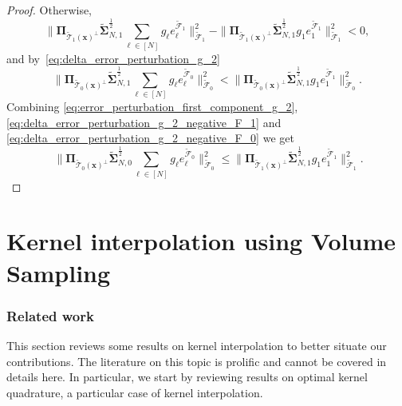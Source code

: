 \documentclass[twoside,11pt]{book}
\newcommand{\rb}[1]{\textcolor{magenta}{#1}}
\begin{document}
\begin{proof}
Otherwise,  
\begin{equation}\label{eq:delta_error_perturbation_g_2_negative_F_1}
 \|\bm{\Pi}_{\tilde{\mathcal{T}}_{1}(\bm{x})^{\perp}} \tilde{\bm{\Sigma}}_{N,1}^{\frac{1}{2}} \sum\limits_{\ell \in [N]}g_{\ell} e_{\ell}^{\tilde{\mathcal{F}}_{1}}\|_{\tilde{\mathcal{F}}_{1}}^{2} - \|\bm{\Pi}_{\tilde{\mathcal{T}}_{1}(\bm{x})^{\perp}} \tilde{\bm{\Sigma}}_{N,1}^{\frac{1}{2}} g_{1} e_{1}^{\tilde{\mathcal{F}}_{1}}\|_{\tilde{\mathcal{F}}_{1}}^{2} < 0, 
\end{equation}
and by~\eqref{eq:delta_error_perturbation_g_2}
\begin{equation}\label{eq:delta_error_perturbation_g_2_negative_F_0}
\|\bm{\Pi}_{\tilde{\mathcal{T}}_{0}(\bm{x})^{\perp}} \tilde{\bm{\Sigma}}_{N,1}^{\frac{1}{2}} \sum\limits_{\ell \in [N]}g_{\ell} e_{\ell}^{\tilde{\mathcal{F}}_{0}}\|_{\tilde{\mathcal{F}}_{0}}^{2} < \|\bm{\Pi}_{\tilde{\mathcal{T}}_{0}(\bm{x})^{\perp}} \tilde{\bm{\Sigma}}_{N,1}^{\frac{1}{2}} g_{1} e_{1}^{\tilde{\mathcal{F}}_{1}}\|_{\tilde{\mathcal{F}}_{0}}^{2}.
\end{equation}
Combining \eqref{eq:error_perturbation_first_component_g_2}, \eqref{eq:delta_error_perturbation_g_2_negative_F_1} and \eqref{eq:delta_error_perturbation_g_2_negative_F_0} 
we get
\begin{equation}
\:\|\bm{\Pi}_{\tilde{\mathcal{T}}_{0}(\bm{x})^{\perp}} \tilde{\bm{\Sigma}}_{N,0}^{\frac{1}{2}} \sum\limits_{\ell \in [N]}g_{\ell} e_{\ell}^{\tilde{\mathcal{F}}_{0}}\|_{\tilde{\mathcal{F}}_{0}}^{2} \leq \|\bm{\Pi}_{\tilde{\mathcal{T}}_{1}(\bm{x})^{\perp}} \tilde{\bm{\Sigma}}_{N,1}^{\frac{1}{2}} g_{1} e_{1}^{\tilde{\mathcal{F}}_{1}}\|_{\tilde{\mathcal{F}}_{1}}^{2}.
\end{equation}
\end{proof}


\clearpage

\chapter{Kernel interpolation using Volume Sampling}

\subsection{Related work}\label{s:relatedWork}
This section reviews some results on kernel interpolation to better situate our contributions. The literature on this topic is prolific and cannot be covered in details here. In particular, we start by reviewing results on optimal kernel quadrature, a particular case of kernel interpolation.
\end{document}
